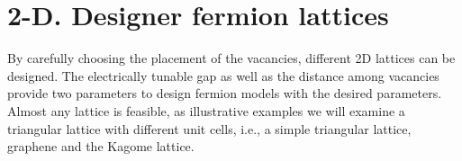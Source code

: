 %
%
%
%
%
%





\section{2-D. Designer fermion lattices} %
By carefully choosing the placement of the vacancies, different 2D lattices can be designed. The electrically tunable gap as well as the distance among vacancies provide two parameters to design fermion models with the desired parameters.
Almost any lattice is feasible, as illustrative examples we will examine a triangular lattice with different unit cells, i.e., a simple triangular lattice, graphene and the Kagome lattice.

